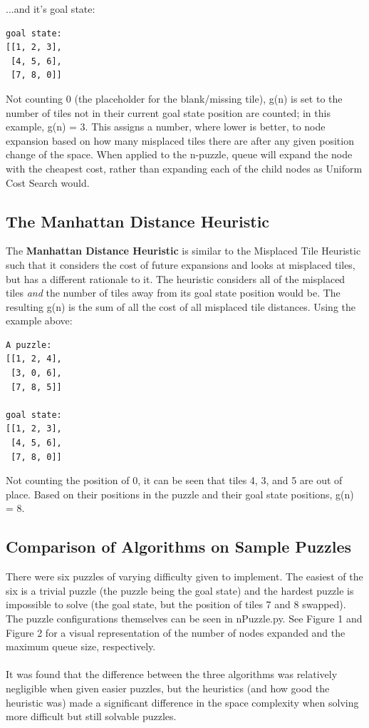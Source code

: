 \documentclass[a4paper]{article}
\begin{document}
...and it's goal state:
\begin{verbatim}
goal state:
[[1, 2, 3],
 [4, 5, 6],
 [7, 8, 0]]
\end{verbatim}

Not counting 0 (the placeholder for the blank/missing tile), g(n) is set to the
 number of tiles not in their current goal state position are counted; in this
 example, g(n) = 3. This assigns a number, where lower is better, to node
 expansion based on how many misplaced tiles there are after any given position
 change of the space. When applied to the n-puzzle, queue will expand the node
 with the cheapest cost, rather than expanding each of the child nodes as
 Uniform Cost Search would.

 \subsection{The Manhattan Distance Heuristic}
 The \textbf{Manhattan Distance Heuristic} is similar to the Misplaced Tile
 Heuristic such that it considers the cost of future expansions and looks at
 misplaced tiles, but has a different rationale to it. The heuristic considers
 all of the misplaced tiles \textit{and} the number of tiles away from its goal
 state position would be. The resulting g(n) is the sum of all the cost of all
 misplaced tile distances. Using the example above:
\begin{verbatim}
A puzzle:
[[1, 2, 4],
 [3, 0, 6],
 [7, 8, 5]]

goal state:
[[1, 2, 3],
 [4, 5, 6],
 [7, 8, 0]]

\end{verbatim}
Not counting the position of 0, it can be seen that tiles 4, 3, and 5 are out of
place. Based on their positions in the puzzle and their goal state positions,
g(n) = 8. 
\subsection{Comparison of Algorithms on Sample Puzzles}
There were six puzzles of varying difficulty given to implement. The easiest
of the six is a trivial puzzle (the puzzle being the goal state) and the hardest puzzle
is impossible to solve (the goal state, but the position of tiles 7 and 8
swapped). The puzzle configurations themselves can be seen in nPuzzle.py.
See Figure 1 and Figure 2 for a visual representation of the number of nodes
expanded and the maximum queue size, respectively. \\ \\ It was found that the
difference between the three algorithms was relatively negligible when given
easier puzzles, but the heuristics (and how good the heuristic was) made a
significant difference in the space complexity when solving more difficult but
still solvable puzzles. 
\end{document}
